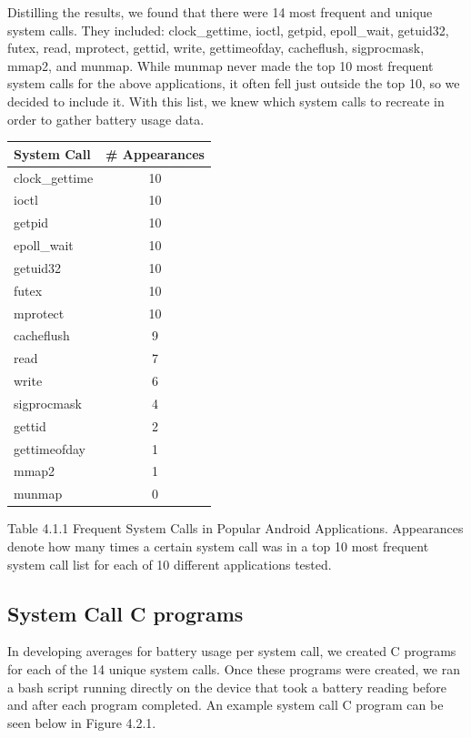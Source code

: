 \documentclass[11pt]{article}
\begin{document}
Distilling the results, we found that there were 14 most frequent and unique system calls. They included:
clock\_gettime, ioctl, getpid, epoll\_wait, getuid32, futex, read, mprotect, gettid, write, gettimeofday, cacheflush, 
sigprocmask, mmap2, and munmap. While munmap never made the top 10 most frequent system calls for the above applications,
it often fell just outside the top 10, so we decided to include it. With this list, we knew which system calls to recreate in order 
to gather battery usage data.
\newline
\begin{tabular}{l c}
   System Call & \# Appearances \\
   \hline
   clock\_gettime & 10 \\
   ioctl & 10 \\
   getpid & 10 \\
   epoll\_wait & 10 \\
   getuid32 & 10 \\
   futex & 10 \\
   mprotect & 10 \\
   cacheflush & 9 \\
   read & 7 \\
   write & 6 \\
   sigprocmask & 4 \\
   gettid & 2 \\
   gettimeofday & 1 \\
   mmap2 & 1 \\
   munmap & 0 \\ 
\end{tabular}
\newline
{\fontsize{11}{13}\selectfont Table 4.1.1 Frequent System Calls in Popular Android Applications. Appearances denote how many
times a certain system call was in a top 10 most frequent system call list for each of 10 different applications tested.}
\newline

\subsection{System Call C programs}

In developing averages for battery usage per system call, we created C programs for each of the 14 unique system 
calls.  Once these programs were created, we ran a bash script running directly on the device that took a battery 
reading before and after each program completed.  An example system call C program can be seen below in Figure 4.2.1.  
\end{document}

